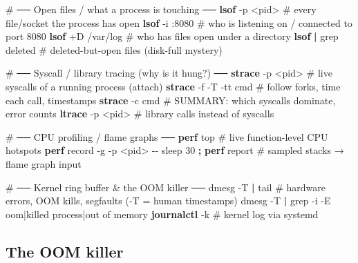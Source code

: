\documentclass[11pt]{article}
\newenvironment{Shaded}{\begin{snugshade}}{\end{snugshade}}
\newcommand{\AttributeTok}[1]{\textcolor[rgb]{0.16,0.50,0.73}{#1}}
\newcommand{\CommentTok}[1]{\textcolor[rgb]{0.48,0.49,0.49}{#1}}
\newcommand{\ExtensionTok}[1]{\textcolor[rgb]{0.00,0.60,1.00}{\textbf{#1}}}
\newcommand{\FunctionTok}[1]{\textcolor[rgb]{0.56,0.27,0.68}{#1}}
\newcommand{\KeywordTok}[1]{\textcolor[rgb]{0.81,0.81,0.76}{\textbf{#1}}}
\newcommand{\NormalTok}[1]{\textcolor[rgb]{0.81,0.81,0.76}{#1}}
\newcommand{\OperatorTok}[1]{\textcolor[rgb]{0.81,0.81,0.76}{#1}}
\newcommand{\StringTok}[1]{\textcolor[rgb]{0.96,0.31,0.31}{#1}}
\begin{document}
\begin{Shaded}
\begin{Highlighting}[]
\CommentTok{\# ── Open files / what a process is touching ──}
\ExtensionTok{lsof} \AttributeTok{{-}p} \OperatorTok{\textless{}}\NormalTok{pid}\OperatorTok{\textgreater{}}        \CommentTok{\# every file/socket the process has open}
\ExtensionTok{lsof} \AttributeTok{{-}i}\NormalTok{ :8080        }\CommentTok{\# who is listening on / connected to port 8080}
\ExtensionTok{lsof}\NormalTok{ +D /var/log     }\CommentTok{\# who has files open under a directory}
\ExtensionTok{lsof} \KeywordTok{|} \FunctionTok{grep}\NormalTok{ deleted  }\CommentTok{\# deleted{-}but{-}open files (disk{-}full mystery)}

\CommentTok{\# ── Syscall / library tracing (why is it hung?) ──}
\ExtensionTok{strace} \AttributeTok{{-}p} \OperatorTok{\textless{}}\NormalTok{pid}\OperatorTok{\textgreater{}}      \CommentTok{\# live syscalls of a running process (attach)}
\ExtensionTok{strace} \AttributeTok{{-}f} \AttributeTok{{-}T} \AttributeTok{{-}tt}\NormalTok{ cmd }\CommentTok{\# follow forks, time each call, timestamps}
\ExtensionTok{strace} \AttributeTok{{-}c}\NormalTok{ cmd        }\CommentTok{\# SUMMARY: which syscalls dominate, error counts}
\ExtensionTok{ltrace} \AttributeTok{{-}p} \OperatorTok{\textless{}}\NormalTok{pid}\OperatorTok{\textgreater{}}      \CommentTok{\# library calls instead of syscalls}

\CommentTok{\# ── CPU profiling / flame graphs ──}
\ExtensionTok{perf}\NormalTok{ top             }\CommentTok{\# live function{-}level CPU hotspots}
\ExtensionTok{perf}\NormalTok{ record }\AttributeTok{{-}g} \AttributeTok{{-}p} \OperatorTok{\textless{}}\NormalTok{pid}\OperatorTok{\textgreater{}}\NormalTok{ {-}{-} sleep 30 }\KeywordTok{;} \ExtensionTok{perf}\NormalTok{ report   }\CommentTok{\# sampled stacks → flame graph input}

\CommentTok{\# ── Kernel ring buffer \& the OOM killer ──}
\FunctionTok{dmesg} \AttributeTok{{-}T} \KeywordTok{|} \FunctionTok{tail}      \CommentTok{\# hardware errors, OOM kills, segfaults ({-}T = human timestamps)}
\FunctionTok{dmesg} \AttributeTok{{-}T} \KeywordTok{|} \FunctionTok{grep} \AttributeTok{{-}i} \AttributeTok{{-}E} \StringTok{\textquotesingle{}oom|killed process|out of memory\textquotesingle{}}
\ExtensionTok{journalctl} \AttributeTok{{-}k}        \CommentTok{\# kernel log via systemd}
\end{Highlighting}
\end{Shaded}

\subsection{The OOM killer}\label{the-oom-killer}
\end{document}
